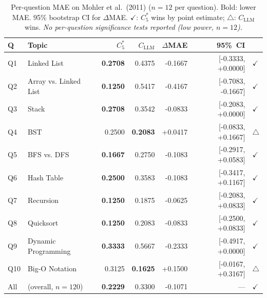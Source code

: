 \begin{table}[ht]\centering
\caption{Per-question MAE on Mohler et al.\ (2011) ($n=12$ per question). Bold: lower MAE. 95\% bootstrap CI for $\Delta$MAE. $\checkmark$: $C_5^{*}$ wins by point estimate; $\triangle$: $C_{\text{LLM}}$ wins. \emph{No per-question significance tests reported (low power, $n=12$).}}
\label{tab:per_question}
\begin{tabular}{@{}llrrrrl@{}}\toprule
\textbf{Q} & \textbf{Topic} & $C_5^{*}$ & $C_{\text{LLM}}$ & $\Delta$MAE & 95\%~CI & \\\midrule
Q1 & Linked List & \textbf{0.2708} & 0.4375 & -0.1667 & [-0.3333, +0.0000] & $\checkmark$ \\
Q2 & Array vs. Linked List & \textbf{0.1250} & 0.5417 & -0.4167 & [-0.7083, -0.1667] & $\checkmark$ \\
Q3 & Stack & \textbf{0.2708} & 0.3542 & -0.0833 & [-0.2083, +0.0000] & $\checkmark$ \\
Q4 & BST & 0.2500 & \textbf{0.2083} & +0.0417 & [-0.0833, +0.1667] & $\triangle$ \\
Q5 & BFS vs. DFS & \textbf{0.1667} & 0.2750 & -0.1083 & [-0.2917, +0.0583] & $\checkmark$ \\
Q6 & Hash Table & \textbf{0.2500} & 0.3583 & -0.1083 & [-0.3417, +0.1167] & $\checkmark$ \\
Q7 & Recursion & \textbf{0.1250} & 0.1875 & -0.0625 & [-0.2083, +0.0833] & $\checkmark$ \\
Q8 & Quicksort & \textbf{0.1250} & 0.2083 & -0.0833 & [-0.2500, +0.0833] & $\checkmark$ \\
Q9 & Dynamic Programming & \textbf{0.3333} & 0.5667 & -0.2333 & [-0.4917, +0.0000] & $\checkmark$ \\
Q10 & Big-O Notation & 0.3125 & \textbf{0.1625} & +0.1500 & [-0.0167, +0.3167] & $\triangle$ \\
\midrule All & (overall, $n=120$) & \textbf{0.2229} & 0.3300 & -0.1071 & --- & $\checkmark$ \\
\bottomrule
\end{tabular}
\end{table}